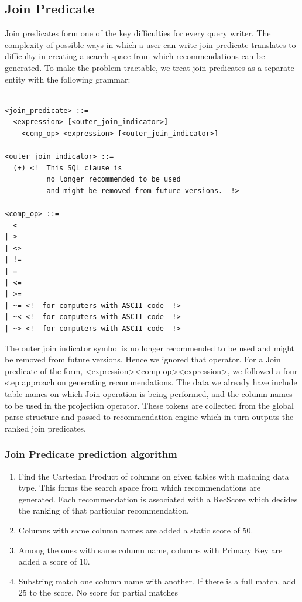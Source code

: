 \documentclass{acm_proc_article-sp}
\begin{document}
\subsection{Join Predicate}
Join predicates form one of the key difficulties for every query writer. The complexity of possible ways in which a user can write join predicate translates to difficulty in creating a search space from which recommendations can be generated. To make the problem tractable, we treat join predicates as a separate entity with the following grammar:

\begin{verbatim}

<join_predicate> ::=
  <expression> [<outer_join_indicator>]
    <comp_op> <expression> [<outer_join_indicator>]

<outer_join_indicator> ::=
  (+) <!  This SQL clause is
          no longer recommended to be used
          and might be removed from future versions.  !>

<comp_op> ::=
  <
| >
| <>
| !=
| =
| <=
| >=
| ~= <!  for computers with ASCII code  !>
| ~< <!  for computers with ASCII code  !>
| ~> <!  for computers with ASCII code  !>

\end{verbatim}


The outer join indicator symbol is no longer recommended to be used and might be removed from future versions. Hence we ignored that operator. For a Join predicate of the form,  \textless expression\textgreater  \textless comp-op\textgreater \textless expression\textgreater, we followed a four step approach on generating recommendations. The data we already have include table names on which Join operation is being performed, and the column names to be used in the projection operator. These tokens are collected from the global parse structure  and passed to recommendation engine which in turn outputs the ranked join predicates. 

\subsubsection{Join Predicate prediction algorithm}
\begin {enumerate}
\item Find the Cartesian Product of columns on given tables with matching data type. This forms the search space from which recommendations are generated. Each recommendation is associated with a RecScore which decides the ranking of that particular recommendation. 
\item Columns with same column names are added a static score of 50.
\item Among the ones with same column name, columns with Primary Key  are added a score of 10.
\item Substring match one column name with another. If there is a full match, add 25 to the score. No score for partial matches 
\end{enumerate}
\end{document}

